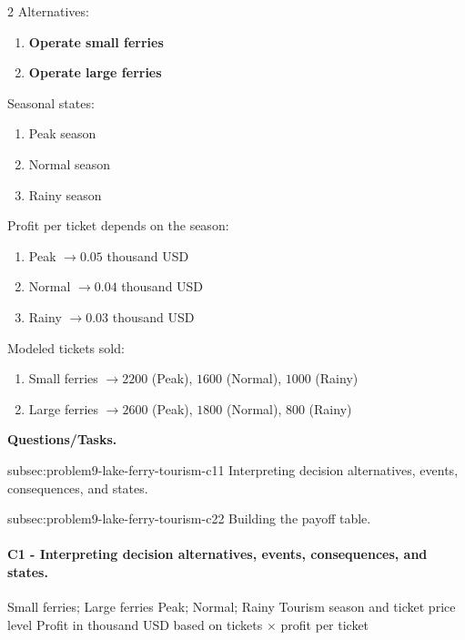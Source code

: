 	\begin{multicols}{2}
		Alternatives:
		\begin{enumerate}[label=\arabic*.]
			\item \textbf{Operate small ferries}
			\item \textbf{Operate large ferries}
		\end{enumerate}

		Seasonal states:
		\begin{enumerate}[label=\arabic*.]
			\item Peak season
			\item Normal season
			\item Rainy season
		\end{enumerate}

			\columnbreak

		Profit per ticket depends on the season:
		\begin{enumerate}[label=\arabic*.]
			\item Peak $\to 0.05$ thousand USD
			\item Normal $\to 0.04$ thousand USD
			\item Rainy $\to 0.03$ thousand USD
		\end{enumerate}

		Modeled tickets sold:
		\begin{enumerate}[label=\arabic*.]
			\item Small ferries $\to 2200$ (Peak), $1600$ (Normal), $1000$ (Rainy)
			\item Large ferries $\to 2600$ (Peak), $1800$ (Normal), $800$ (Rainy)
		\end{enumerate}
	\end{multicols}

	\textbf{Questions/Tasks.}
	\begin{enumerate}
		\CriterionTask
		{subsec:problem9-lake-ferry-tourism-c1}{1}
		{Interpreting decision alternatives, events, consequences, and states.}

		\CriterionTask
		{subsec:problem9-lake-ferry-tourism-c2}{2}
		{Building the payoff table.}
	\end{enumerate}

	\paragraph*{C1 - Interpreting decision alternatives, events, consequences, and states.}
	\label{subsec:problem9-lake-ferry-tourism-c1}
	\DecisionElementsTable
	{Small ferries; Large ferries}
	{Peak; Normal; Rainy}
	{Tourism season and ticket price level}
	{Profit in thousand USD based on tickets $\times$ profit per ticket}

